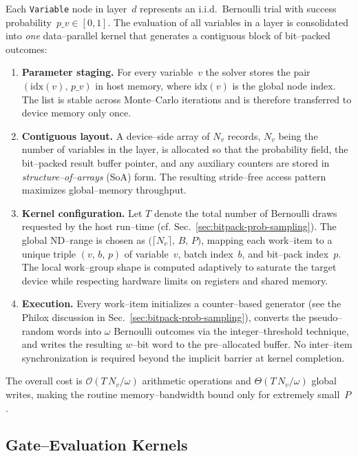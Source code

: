 Each \texttt{Variable} node in layer~$d$ represents an i.i.d.~Bernoulli trial
with success probability~$p\_v\in[0,1]$.  The evaluation of all variables in
a layer is consolidated into 
\emph{one} data--parallel kernel that generates a contiguous block of
bit--packed outcomes:
\begin{enumerate}
  \item \textbf{Parameter staging.}  For every variable~$v$ the solver stores the
        pair $(\text{idx}(v),\,p\_v)$ in host memory, where
        $\text{idx}(v)$ is the global node index.  The list is stable across
        Monte--Carlo iterations and is therefore transferred to device memory
        only once.
  \item \textbf{Contiguous layout.}  A device--side array of $N_{\!v}$
        records, $N_{\!v}$ being the number of variables in the layer, is
        allocated so that the probability field, the bit--packed result buffer
        pointer, and any auxiliary counters are stored in
        \emph{structure--of--arrays} (SoA) form.  The resulting stride--free
        access pattern maximizes global--memory throughput.
  \item \textbf{Kernel configuration.}  Let $T$ denote the total number of
        Bernoulli draws requested by the host run--time (cf.
        Sec.~\ref{sec:bitpack-prob-sampling}).  The global ND--range is chosen
        as $\bigl(\lceil N_{\!v}\rceil,\,B,\,P\bigr)$, mapping each work--item
        to a unique triple $(v,\,b,\,p)$ of variable~$v$, batch index~$b$, and
        bit--pack index~$p$.  The local work--group shape is computed
        adaptively to saturate the target device while respecting hardware
        limits on registers and shared memory.
  \item \textbf{Execution.}  Every work--item initializes a counter--based
        generator (see the Philox discussion in
        Sec.~\ref{sec:bitpack-prob-sampling}), converts the pseudo--random words
        into $\omega$ Bernoulli outcomes via the integer--threshold technique,
        and writes the resulting $w$--bit word to the pre--allocated buffer.
        No inter--item synchronization is required beyond the implicit barrier
        at kernel completion.
\end{enumerate}
The overall cost is $\mathcal{O}(T\,N_{\!v}/\omega)$ arithmetic operations and
$\Theta(T\,N_{\!v}/\omega)$ global writes, making the routine
memory--bandwidth bound only for extremely small~$P$.

\subsection{Gate--Evaluation Kernels}
\label{subsec:gate_kernel}

